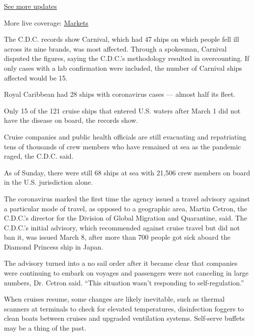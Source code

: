 \href{https://www.nytimes3xbfgragh.onion/2020/08/20/world/coronavirus-covid.html?action=click\&pgtype=Article\&state=default\&region=MAIN_CONTENT_1\&context=storylines_live_updates}{See
more updates}

More live coverage:
\href{https://www.nytimes3xbfgragh.onion/live/2020/08/20/business/stock-market-today-coronavirus?action=click\&pgtype=Article\&state=default\&region=MAIN_CONTENT_1\&context=storylines_live_updates}{Markets}

The C.D.C. records show Carnival, which had 47 ships on which people
fell ill across its nine brands, was most affected. Through a spokesman,
Carnival disputed the figures, saying the C.D.C.'s methodology resulted
in overcounting. If only cases with a lab confirmation were included,
the number of Carnival ships affected would be 15.

Royal Caribbean had 28 ships with coronavirus cases --- almost half its
fleet.

Only 15 of the 121 cruise ships that entered U.S. waters after March 1
did not have the disease on board, the records show.

Cruise companies and public health officials are still evacuating and
repatriating tens of thousands of crew members who have remained at sea
as the pandemic raged, the C.D.C. said.

As of Sunday, there were still 68 ships at sea with 21,506 crew members
on board in the U.S. jurisdiction alone.

The coronavirus marked the first time the agency issued a travel
advisory against a particular mode of travel, as opposed to a geographic
area, Martin Cetron, the C.D.C.'s director for the Division of Global
Migration and Quarantine, said. The C.D.C.'s initial advisory, which
recommended against cruise travel but did not ban it, was issued March
8, after more than 700 people got sick aboard the Diamond Princess ship
in Japan.

The advisory turned into a no sail order after it became clear that
companies were continuing to embark on voyages and passengers were not
canceling in large numbers, Dr. Cetron said. ``This situation wasn't
responding to self-regulation.''

When cruises resume, some changes are likely inevitable, such as thermal
scanners at terminals to check for elevated temperatures, disinfection
foggers to clean boats between cruises and upgraded ventilation systems.
Self-serve buffets may be a thing of the past.

